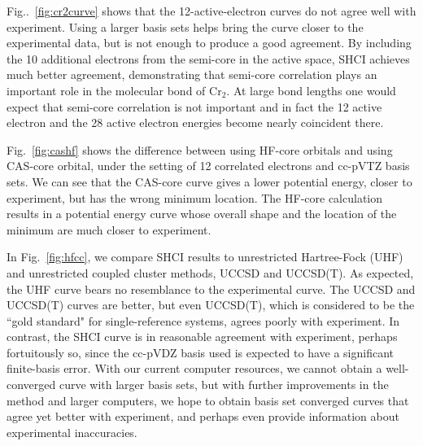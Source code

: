 Fig..~\ref{fig:cr2curve} shows that the 12-active-electron curves do not agree well with experiment.
Using a larger basis sets helps bring the curve closer to the experimental data, but is not enough to produce a good agreement.
By including the 10 additional electrons from the semi-core in the active space, SHCI achieves much better agreement,
demonstrating that semi-core correlation plays an important role in the molecular bond of Cr$_2$.
At large bond lengths one would expect that semi-core correlation is not important and in fact the 12 active electron
and the 28 active electron energies become nearly coincident there.

Fig.~\ref{fig:cashf} shows the difference between using HF-core orbitals and using CAS-core orbital, under the setting of 12 correlated electrons and cc-pVTZ basis sets.
We can see that the CAS-core curve gives a lower potential energy, closer to experiment, but has the wrong minimum location.
The HF-core calculation results in a potential energy curve whose overall shape and the location of the minimum are much closer to experiment.


In Fig.~\ref{fig:hfcc}, we compare SHCI results to unrestricted Hartree-Fock (UHF) and unrestricted coupled cluster methods, UCCSD and UCCSD(T).
As expected, the UHF curve bears no resemblance to the experimental curve.
The UCCSD and UCCSD(T) curves are better, but even UCCSD(T), which is considered to be the ``gold standard" for single-reference
systems, agrees poorly with experiment.  In contrast, the SHCI curve is in reasonable agreement with experiment, perhaps
fortuitously so, since the cc-pVDZ basis used is expected to have a significant finite-basis error.
With our current computer resources, we cannot obtain a well-converged curve with larger basis sets,
but with further improvements in the method and larger computers, we hope to obtain basis set converged curves
that agree yet better with experiment, and perhaps even provide information about experimental inaccuracies.

